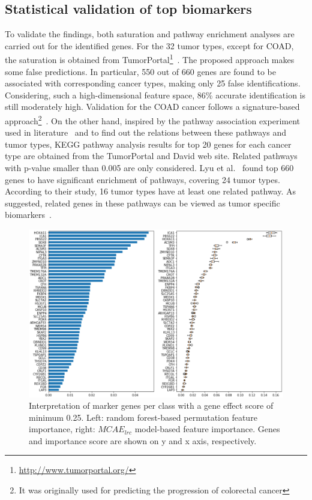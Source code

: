 \subsection{Statistical validation of top biomarkers}
To validate the findings, both saturation and pathway enrichment analyses are carried out for the identified genes. For the 32 tumor types, except for COAD, the saturation is obtained from TumorPortal\footnote{ \url{http://www.tumorportal.org/}}~\cite{lawrence2014discovery}. The proposed approach makes some false predictions. In particular, 550 out of 660 genes are found to be associated with corresponding cancer types, making only 25 false identifications. Considering, such a high-dimensional feature space, 86\% accurate identification is still moderately high.
Validation for the COAD cancer follows a signature-based approach\footnote{It was originally used for predicting the progression of colorectal cancer}~\cite{zuo2019identification}. On the other hand, inspired by the pathway association experiment used in literature~\cite{lyu2018deep} and to find out the relations between these pathways and tumor types, KEGG pathway analysis results for top 20 genes for each cancer type are obtained from the TumorPortal and David web site. 
Related pathways with p-value smaller than 0.005 are only considered. Lyu et al.~\cite{lyu2018deep} found top 660 genes to have significant enrichment of pathways, covering 24 tumor types. According to their study, 16 tumor types have at least one related pathway. As suggested, related genes in these pathways can be viewed as tumor specific biomarkers~\cite{lyu2018deep}. 

\begin{figure}
\centering
	\includegraphics[scale=1.0]{images/rf_fi.png}
	\caption[Interpretation of marker genes]{Interpretation of marker genes per class with a gene effect score of minimum 0.25. Left: random forest-based permutation feature importance, right: $MCAE_{lrc}$ model-based feature importance. Genes and importance score are shown on y and x axis, respectively. }
    \label{fig:pfi}
\end{figure}

